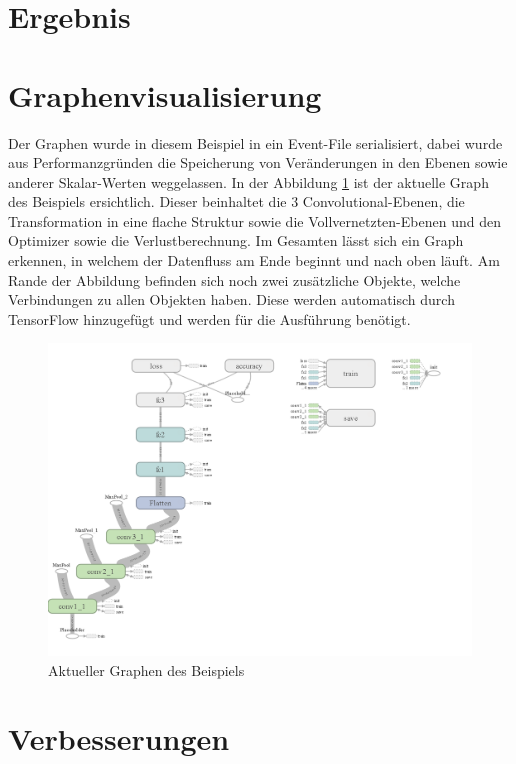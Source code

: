 \section{Ergebnis}

\section{Graphenvisualisierung}

Der Graphen wurde in diesem Beispiel in ein Event-File serialisiert, dabei wurde aus Performanzgründen die Speicherung von Veränderungen in den Ebenen sowie anderer Skalar-Werten weggelassen. 
In der Abbildung \ref{fig:graphDig} ist der aktuelle Graph des Beispiels ersichtlich. 
Dieser beinhaltet die $3$ Convolutional-Ebenen, die Transformation in eine flache Struktur sowie die Vollvernetzten-Ebenen und den Optimizer sowie die Verlustberechnung. 
Im Gesamten lässt sich ein Graph erkennen, in welchem der Datenfluss am Ende beginnt und nach oben läuft. 
Am Rande der Abbildung befinden sich noch zwei zusätzliche Objekte, welche Verbindungen zu allen Objekten haben. 
Diese werden automatisch durch TensorFlow hinzugefügt und werden für die Ausführung benötigt. 
\begin{figure}
	\centering
	\includegraphics[scale=0.28]{images/graph-run.png}
	\caption{Aktueller Graphen des Beispiels}
	\label{fig:graphDig}
\end{figure}

\section{Verbesserungen}

